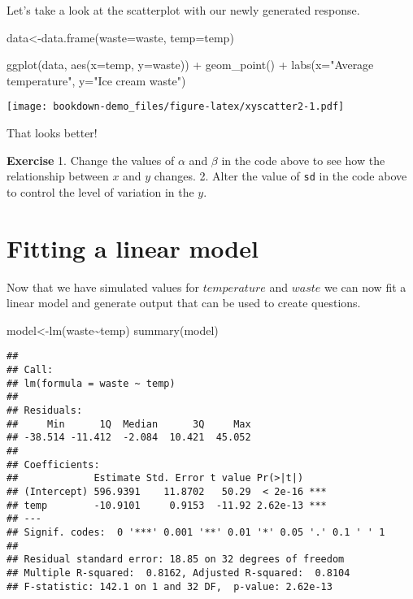 \documentclass[
]{book}
\newenvironment{Shaded}{\begin{snugshade}}{\end{snugshade}}
\newcommand{\AttributeTok}[1]{\textcolor[rgb]{0.77,0.63,0.00}{#1}}
\newcommand{\FunctionTok}[1]{\textcolor[rgb]{0.00,0.00,0.00}{#1}}
\newcommand{\NormalTok}[1]{#1}
\newcommand{\OtherTok}[1]{\textcolor[rgb]{0.56,0.35,0.01}{#1}}
\newcommand{\SpecialCharTok}[1]{\textcolor[rgb]{0.00,0.00,0.00}{#1}}
\newcommand{\StringTok}[1]{\textcolor[rgb]{0.31,0.60,0.02}{#1}}
\begin{document}
Let's take a look at the scatterplot with our newly generated response.

\begin{Shaded}
\begin{Highlighting}[]
\NormalTok{data}\OtherTok{\textless{}{-}}\FunctionTok{data.frame}\NormalTok{(}\AttributeTok{waste=}\NormalTok{waste, }\AttributeTok{temp=}\NormalTok{temp)}

\FunctionTok{ggplot}\NormalTok{(data, }\FunctionTok{aes}\NormalTok{(}\AttributeTok{x=}\NormalTok{temp, }\AttributeTok{y=}\NormalTok{waste)) }\SpecialCharTok{+} 
  \FunctionTok{geom\_point}\NormalTok{() }\SpecialCharTok{+} 
  \FunctionTok{labs}\NormalTok{(}\AttributeTok{x=}\StringTok{"Average temperature"}\NormalTok{, }\AttributeTok{y=}\StringTok{"Ice cream waste"}\NormalTok{)}
\end{Highlighting}
\end{Shaded}

\texttt{[image: bookdown-demo\_files/figure-latex/xyscatter2-1.pdf]}

That looks better!

\textbf{Exercise}
1. Change the values of \(\alpha\) and \(\beta\) in the code above to see how the relationship between \(x\) and \(y\) changes.
2. Alter the value of \texttt{sd} in the code above to control the level of variation in the \(y\).

\hypertarget{fitting-a-linear-model}{%
\section{Fitting a linear model}\label{fitting-a-linear-model}}

Now that we have simulated values for \(temperature\) and \(waste\) we can now fit a linear model and generate output that can be used to create questions.

\begin{Shaded}
\begin{Highlighting}[]
\NormalTok{model}\OtherTok{\textless{}{-}}\FunctionTok{lm}\NormalTok{(waste}\SpecialCharTok{\textasciitilde{}}\NormalTok{temp)}
\FunctionTok{summary}\NormalTok{(model)}
\end{Highlighting}
\end{Shaded}

\begin{verbatim}
## 
## Call:
## lm(formula = waste ~ temp)
## 
## Residuals:
##     Min      1Q  Median      3Q     Max 
## -38.514 -11.412  -2.084  10.421  45.052 
## 
## Coefficients:
##             Estimate Std. Error t value Pr(>|t|)    
## (Intercept) 596.9391    11.8702   50.29  < 2e-16 ***
## temp        -10.9101     0.9153  -11.92 2.62e-13 ***
## ---
## Signif. codes:  0 '***' 0.001 '**' 0.01 '*' 0.05 '.' 0.1 ' ' 1
## 
## Residual standard error: 18.85 on 32 degrees of freedom
## Multiple R-squared:  0.8162, Adjusted R-squared:  0.8104 
## F-statistic: 142.1 on 1 and 32 DF,  p-value: 2.62e-13
\end{verbatim}
\end{document}
